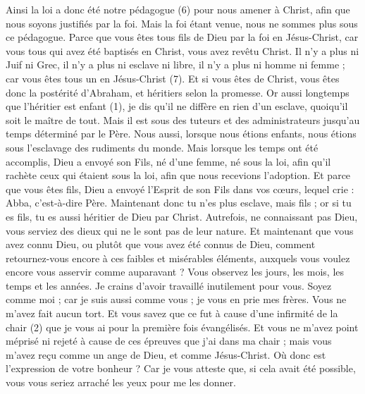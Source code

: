 \begin{multicols}{2}
Ainsi la loi a donc été notre pédagogue (6) pour nous amener à Christ, afin que nous soyons justifiés par la foi.
Mais la foi étant venue, nous ne sommes plus sous ce pédagogue.
Parce que vous êtes tous fils de Dieu par la foi en Jésus-Christ,
car vous tous qui avez été baptisés en Christ, vous avez revêtu Christ.
Il n'y a plus ni Juif ni Grec, il n’y a plus ni esclave ni libre, il n’y a plus ni homme ni femme ; car vous êtes tous un en Jésus-Christ (7).
Et si vous êtes de Christ, vous êtes donc la postérité d'Abraham, et héritiers selon la promesse.
\VerseOne{}Or aussi longtemps que l’héritier est enfant (1), je dis qu’il ne diffère en rien d’un esclave, quoiqu’il soit le maître de tout.
Mais il est sous des tuteurs et des administrateurs jusqu'au temps déterminé par le Père.
Nous aussi, lorsque nous étions enfants, nous étions sous l’esclavage des rudiments du monde.
Mais lorsque les temps ont été accomplis, Dieu a envoyé son Fils, né d'une femme, né sous la loi,
afin qu'il rachète ceux qui étaient sous la loi, afin que nous recevions l'adoption.
Et parce que vous êtes fils, Dieu a envoyé l'Esprit de son Fils dans vos cœurs, lequel crie : Abba, c'est-à-dire Père.
Maintenant donc tu n'es plus esclave, mais fils ; or si tu es fils, tu es aussi héritier de Dieu par Christ.
Autrefois, ne connaissant pas Dieu, vous serviez des dieux qui ne le sont pas de leur nature.
Et maintenant que vous avez connu Dieu, ou plutôt que vous avez été connus de Dieu, comment retournez-vous encore à ces faibles et misérables éléments, auxquels vous voulez encore vous asservir comme auparavant ?
Vous observez les jours, les mois, les temps et les années.
Je crains d’avoir travaillé inutilement pour vous.
Soyez comme moi ; car je suis aussi comme vous ; je vous en prie mes frères.
Vous ne m'avez fait aucun tort. Et vous savez que ce fut à cause d’une infirmité de la chair (2) que je vous ai pour la première fois évangélisés.
Et vous ne m’avez point méprisé ni rejeté à cause de ces épreuves que j’ai dans ma chair ; mais vous m'avez reçu comme un ange de Dieu, et comme Jésus-Christ.
Où donc est l’expression de votre bonheur ? Car je vous atteste que, si cela avait été possible, vous vous seriez arraché les yeux pour me les donner.

\end{multicols}
